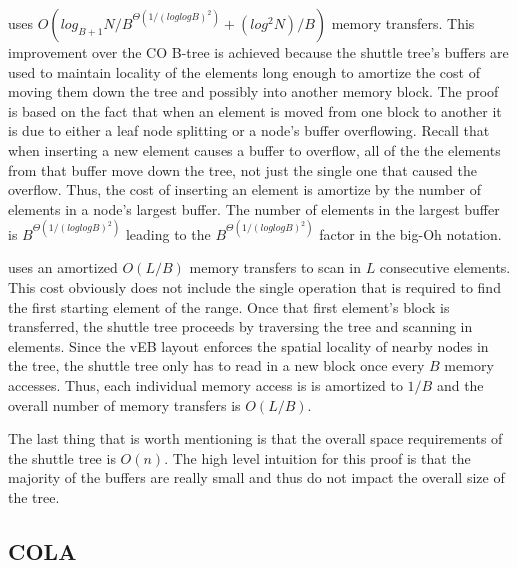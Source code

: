 \documentclass{style}
\begin{document}

\Insert{} uses $O(log_{B+1} N / B^{\Theta(1/(loglogB)^2)} + (log^2 N) / B)$
memory transfers. This improvement over the CO B-tree is achieved because the
shuttle tree's buffers are used to maintain locality of the elements long
enough to amortize the cost of moving them down the tree and possibly into
another memory block. The proof is based on the fact that when an element is
moved from one block to another it is due to either a leaf node splitting or a
node's buffer overflowing. Recall that when inserting a new element causes a
buffer to overflow, all of the the elements from that buffer move down the
tree, not just the single one that caused the overflow. Thus, the cost of
inserting an element is amortize by the number of elements in a node's largest
buffer. The number of elements in the largest buffer is
$B^{\Theta(1/(loglogB)^2)}$ leading to the $B^{\Theta(1/(loglogB)^2)}$ factor
in the big-Oh notation.

\Scan{} uses an amortized $O(L/B)$ memory transfers to scan in $L$ consecutive
elements. This cost obviously does not include the single \Search{} operation
that is required to find the first starting element of the range. Once that
first element's block is transferred, the shuttle tree proceeds by traversing
the tree and scanning in elements. Since the vEB layout enforces the spatial
locality of nearby nodes in the tree, the shuttle tree only has to read in a
new block once every $B$ memory accesses. Thus, each individual memory access
is is amortized to $1/B$ and the overall number of memory transfers is
$O(L/B)$.

The last thing that is worth mentioning is that the overall space requirements
of the shuttle tree is $O(n)$. The high level intuition for this proof is that
the majority of the buffers are really small and thus do not impact the
overall size of the tree.

\subsection{COLA}
\end{document}
